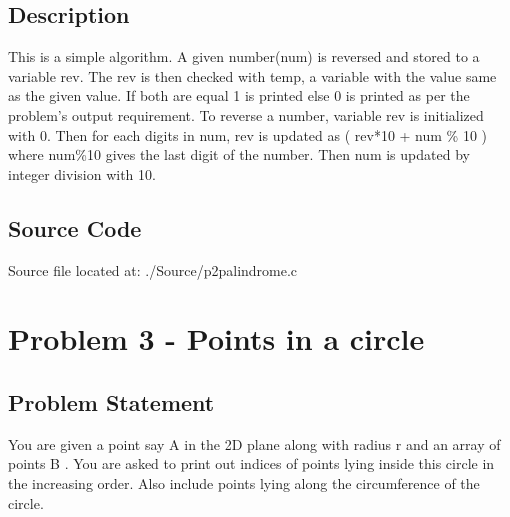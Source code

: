 \documentclass{article}
\begin{document}
\subsection{Description}
This is a simple algorithm. A given number(num) is reversed and stored to a variable rev. The rev is then checked with temp, a variable with the value same as the given value. If both are equal 1 is printed else 0 is printed as per the problem's output requirement. \newline
To reverse a number, variable rev is initialized with 0. Then for each digits in num, rev is updated as ( rev*10 + num \% 10 ) where num\%10 gives the last digit of the number. Then num is updated by integer division with 10.
\subsection{Source Code}
Source file located at: ./Source/p2palindrome.c

\newpage
\section{Problem 3 - Points in a circle}
\subsection{Problem Statement}
You are given a point say A in the 2D plane along with radius r and an array of points B . You are asked to print out indices of points lying inside this circle in the increasing order. Also include points lying along the circumference of the circle.
\end{document}
